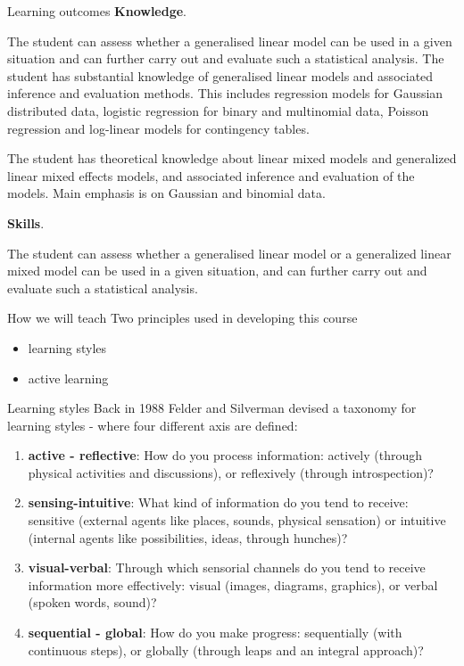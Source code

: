 \documentclass[
  ignorenonframetext,
]{beamer}
\providecommand{\tightlist}{%
  \setlength{\itemsep}{0pt}\setlength{\parskip}{0pt}}
\begin{document}
\begin{frame}{Learning outcomes}
\label{learning-outcomes}
\textbf{Knowledge}.

The student can assess whether a generalised linear model can be used in
a given situation and can further carry out and evaluate such a
statistical analysis. The student has substantial knowledge of
generalised linear models and associated inference and evaluation
methods. This includes regression models for Gaussian distributed data,
logistic regression for binary and multinomial data, Poisson regression
and log-linear models for contingency tables.

The student has theoretical knowledge about linear mixed models and
generalized linear mixed effects models, and associated inference and
evaluation of the models. Main emphasis is on Gaussian and binomial
data.

\textbf{Skills}.

The student can assess whether a generalised linear model or a
generalized linear mixed model can be used in a given situation, and can
further carry out and evaluate such a statistical analysis.
\end{frame}

\begin{frame}{How we will teach}
\label{how-we-will-teach}
Two principles used in developing this course

\begin{itemize}
\tightlist
\item
  learning styles
\item
  active learning
\end{itemize}
\end{frame}

\begin{frame}{Learning styles}
\label{learning-styles}
Back in 1988 Felder and Silverman devised a taxonomy for learning styles
- where four different axis are defined:

\begin{enumerate}
[1)]
\tightlist
\item
  \textbf{active - reflective}: How do you process information: actively
  (through physical activities and discussions), or reflexively (through
  introspection)?
\item
  \textbf{sensing-intuitive}: What kind of information do you tend to
  receive: sensitive (external agents like places, sounds, physical
  sensation) or intuitive (internal agents like possibilities, ideas,
  through hunches)?
\item
  \textbf{visual-verbal}: Through which sensorial channels do you tend
  to receive information more effectively: visual (images, diagrams,
  graphics), or verbal (spoken words, sound)?
\item
  \textbf{sequential - global}: How do you make progress: sequentially
  (with continuous steps), or globally (through leaps and an integral
  approach)?
\end{enumerate}
\end{frame}
\end{document}
